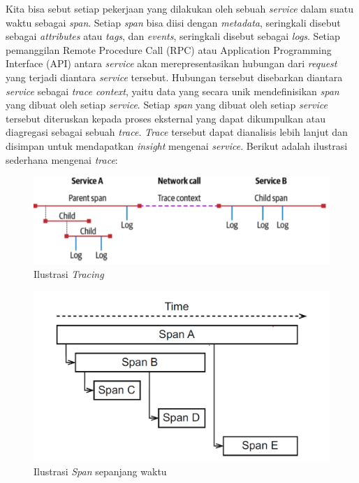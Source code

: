 Kita bisa sebut setiap pekerjaan yang dilakukan oleh sebuah \textit{service} dalam suatu waktu sebagai \textit{span}.
Setiap \textit{span} bisa diisi dengan \textit{metadata}, seringkali disebut sebagai \textit{attributes} atau \textit{tags}, dan \textit{events}, seringkali disebut sebagai \textit{logs}.
Setiap pemanggilan Remote Procedure Call (RPC) atau Application Programming Interface (API) antara \textit{service} akan merepresentasikan hubungan dari \textit{request} yang terjadi diantara \textit{service} tersebut.
Hubungan tersebut disebarkan diantara \textit{service} sebagai \textit{trace context}, yaitu data yang secara unik mendefinisikan \textit{span} yang dibuat oleh setiap \textit{service}.
Setiap \textit{span} yang dibuat oleh setiap \textit{service} tersebut diteruskan kepada proses eksternal yang dapat dikumpulkan atau diagregasi sebagai sebuah \textit{trace}.
\textit{Trace} tersebut dapat dianalisis lebih lanjut dan disimpan untuk mendapatkan \textit{insight} mengenai \textit{service}.
Berikut adalah ilustrasi sederhana mengenai \textit{trace}:
\begin{figure}[htb]
      \centering
      \includegraphics[width=1\textwidth]{resources/ch2/tracing-illus.png}
      \caption{Ilustrasi \textit{Tracing} \citep{parker2020distributed}}
      \label{TracingIlllustration}
\end{figure}
\begin{figure}[htb]
	\centering
	\includegraphics[width=1\textwidth]{resources/ch2/trace-ilus-2.png}
	\caption{Ilustrasi \textit{Span} sepanjang waktu \citep{bento2021}}
	\label{TracingIlllustration}
\end{figure}


